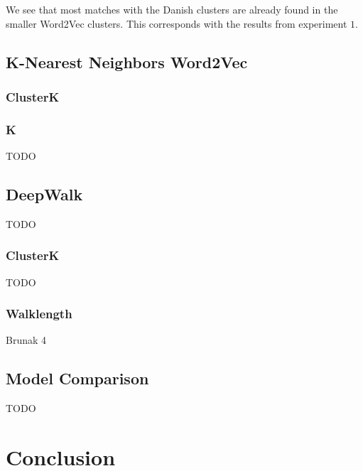 \noindent We see that most matches with the Danish clusters are already found in the smaller Word2Vec clusters. This corresponds with the results from experiment $1$.

\subsection{K-Nearest Neighbors Word2Vec}


\subsubsection{ClusterK}

\subsubsection{K}

TODO

\subsection{DeepWalk}

TODO


\subsubsection{ClusterK}

TODO

\subsubsection{Walklength}

Brunak 4


\subsection{Model Comparison}

TODO

\section{Conclusion}





